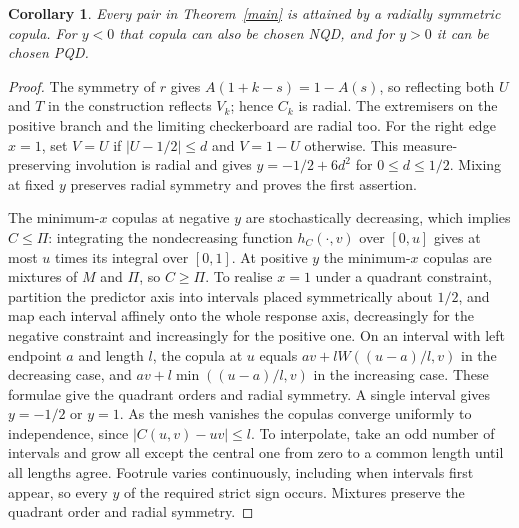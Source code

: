 \documentclass[11pt,a4paper]{article}
\newtheorem{corollary}[theorem]{Corollary}
\theoremstyle{remark}
\newcommand{\1}{\mathbf 1}
\begin{document}
\begin{corollary}\label{subclass}
Every pair in Theorem~\ref{main} is attained by a radially symmetric copula. For $y<0$ that copula can also be chosen NQD, and for $y>0$ it can be chosen PQD.
\end{corollary}
\begin{proof}
The symmetry of $r$ gives $A(1+k-s)=1-A(s)$, so reflecting both $U$ and $T$ in the construction reflects $V_k$; hence $C_k$ is radial. The extremisers on the positive branch and the limiting checkerboard are radial too. For the right edge $x=1$, set $V=U$ if $|U-1/2|\le d$ and $V=1-U$ otherwise. This measure-preserving involution is radial and gives $y=-1/2+6d^2$ for $0\le d\le1/2$. Mixing at fixed $y$ preserves radial symmetry and proves the first assertion.

The minimum-$x$ copulas at negative $y$ are stochastically decreasing, which implies $C\le\Pi$: integrating the nondecreasing function $h_C(\cdot,v)$ over $[0,u]$ gives at most $u$ times its integral over $[0,1]$. At positive $y$ the minimum-$x$ copulas are mixtures of $M$ and $\Pi$, so $C\ge\Pi$. To realise $x=1$ under a quadrant constraint, partition the predictor axis into intervals placed symmetrically about $1/2$, and map each interval affinely onto the whole response axis, decreasingly for the negative constraint and increasingly for the positive one. On an interval with left endpoint $a$ and length $l$, the copula at $u$ equals $av+lW((u-a)/l,v)$ in the decreasing case, and $av+l\min((u-a)/l,v)$ in the increasing case. These formulae give the quadrant orders and radial symmetry. A single interval gives $y=-1/2$ or $y=1$. As the mesh vanishes the copulas converge uniformly to independence, since $|C(u,v)-uv|\le l$. To interpolate, take an odd number of intervals and grow all except the central one from zero to a common length until all lengths agree. Footrule varies continuously, including when intervals first appear, so every $y$ of the required strict sign occurs. Mixtures preserve the quadrant order and radial symmetry.
\end{proof}
\end{document}
